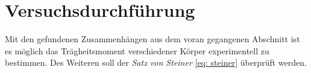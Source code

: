 \section{Versuchsdurchführung}
Mit den gefundenen Zusammenhängen aus dem voran gegangenen Abschnitt ist es
möglich das Trägheitsmoment verschiedener Körper experimentell zu bestimmen.
Des Weiteren soll der \textit{Satz von Steiner} \eqref{eq: steiner} überprüft
werden.
\subsection{}
